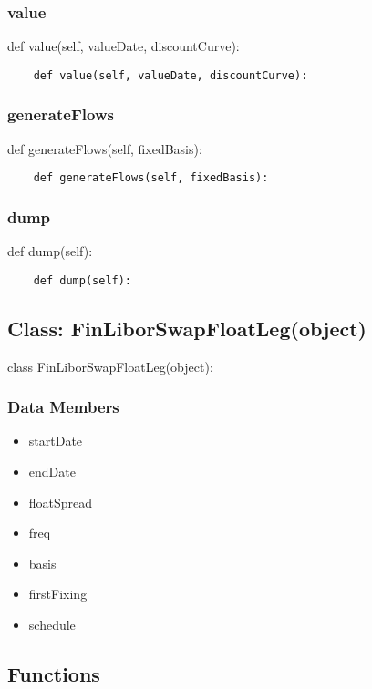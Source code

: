 \documentclass[twoside,11pt]{book}
\begin{document}
\subsubsection*{{\bf value}}
def value(self, valueDate, discountCurve): 

\begin{lstlisting}
    def value(self, valueDate, discountCurve):
\end{lstlisting}

\subsubsection*{{\bf generateFlows}}
def generateFlows(self, fixedBasis): 

\begin{lstlisting}
    def generateFlows(self, fixedBasis):
\end{lstlisting}

\subsubsection*{{\bf dump}}
def dump(self): 

\begin{lstlisting}
    def dump(self):
\end{lstlisting}

\subsection*{Class: FinLiborSwapFloatLeg(object)}
class FinLiborSwapFloatLeg(object): 

\subsubsection*{Data Members}
\begin{itemize}
\item{startDate}
\item{endDate}
\item{floatSpread}
\item{freq}
\item{basis}
\item{firstFixing}
\item{schedule}
\end{itemize}

\subsection*{Functions}
\end{document}
